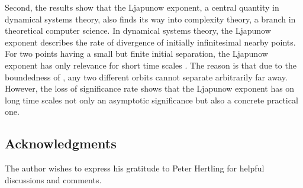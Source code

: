 \documentclass[copyright,creativecommons]{eptcs}
\theoremstyle{definition}
\begin{document}
Second, the results show that the Ljapunow exponent, a central
quantity in dynamical systems theory, also finds its way into
complexity theory, a branch in theoretical computer science.
In dynamical systems theory, the Ljapunow exponent describes
the rate of divergence of initially infinitesimal nearby
points. For two points having a small but finite initial
separation, the Ljapunow exponent has only relevance for
short time scales \cite{ce06}. The reason is that due to the
boundedness of , any two different orbits cannot separate
arbitrarily far away. However, the loss of significance rate
shows that the Ljapunow exponent has on long time scales
not only an asymptotic significance but also a concrete
practical one.


\subsection*{Acknowledgments}

The author wishes to express his gratitude to Peter Hertling for helpful
discussions and comments.



\end{document}
